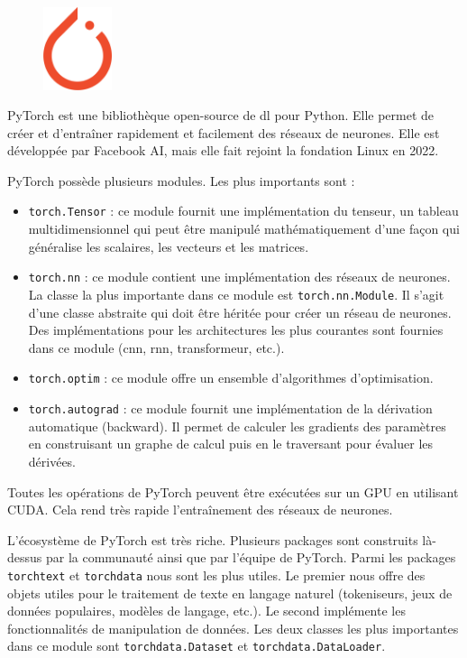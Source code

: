 \begin{figure}
    \vspace*{-\topsep}
    \begin{flushright}
        \includegraphics[width=2cm]{assets/images/torch.png}
    \end{flushright}
\end{figure}
PyTorch est une bibliothèque open-source de \gls{dl} pour Python.
Elle permet de créer et d'entraîner rapidement et facilement des réseaux de neurones.
Elle est développée par Facebook AI, mais elle fait rejoint la fondation Linux en 2022.

PyTorch possède plusieurs modules.
Les plus importants sont :
\begin{itemize}
    \item \verb|torch.Tensor| : 
    ce module fournit une implémentation du tenseur,
    un tableau multidimensionnel qui peut être manipulé mathématiquement 
    d'une façon qui généralise les scalaires, les vecteurs et les matrices.
    \item \verb|torch.nn| : 
    ce module contient une implémentation des réseaux de neurones.
    La classe la plus importante dans ce module est \verb|torch.nn.Module|.
    Il s'agit d'une classe abstraite qui doit être héritée pour créer un réseau de neurones.
    Des implémentations pour les architectures les plus courantes sont fournies dans ce module
    (\gls{cnn}, \gls{rnn}, transformeur, etc.).
    \item \verb|torch.optim| : 
    ce module offre un ensemble d'algorithmes d'optimisation.
    \item \verb|torch.autograd| : 
    ce module fournit une implémentation de la dérivation automatique (\foreignlanguage{english}{backward}).
    Il permet de calculer les gradients des paramètres en construisant un graphe de calcul 
    puis en le traversant pour évaluer les dérivées.
\end{itemize}
Toutes les opérations de PyTorch peuvent être exécutées sur un GPU en utilisant CUDA.
Cela rend très rapide l'entraînement des réseaux de neurones.

L'écosystème de PyTorch est très riche.
Plusieurs packages sont construits là-dessus par la communauté ainsi que par l'équipe de PyTorch.
Parmi les packages \verb|torchtext| et \verb|torchdata| nous sont les plus utiles.
Le premier nous offre des objets utiles pour le traitement de texte en langage naturel
(tokeniseurs, jeux de données populaires, modèles de langage, etc.).
Le second implémente les fonctionnalités de manipulation de données.
Les deux classes les plus importantes dans ce module sont \verb|torchdata.Dataset| et \verb|torchdata.DataLoader|.

